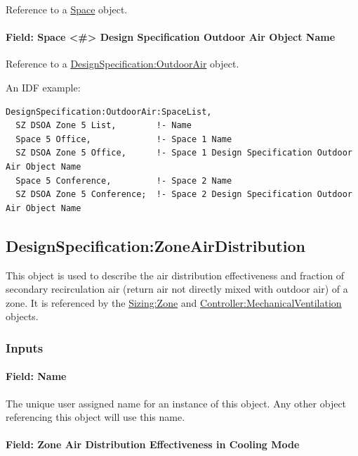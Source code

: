Reference to a \hyperref[space]{Space} object.

\paragraph{Field: Space \textless{}\#\textgreater{} Design Specification Outdoor Air Object Name}\label{field-dsoaspacelist-dsoa-name}

Reference to a \hyperref[designspecificationoutdoorair]{DesignSpecification:OutdoorAir} object.

An IDF example:

\begin{lstlisting}
DesignSpecification:OutdoorAir:SpaceList,
  SZ DSOA Zone 5 List,        !- Name
  Space 5 Office,             !- Space 1 Name
  SZ DSOA Zone 5 Office,      !- Space 1 Design Specification Outdoor Air Object Name
  Space 5 Conference,         !- Space 2 Name
  SZ DSOA Zone 5 Conference;  !- Space 2 Design Specification Outdoor Air Object Name
\end{lstlisting}

\subsection{DesignSpecification:ZoneAirDistribution}\label{designspecificationzoneairdistribution}

This object is used to describe the air distribution effectiveness and fraction of secondary recirculation air (return air not directly mixed with outdoor air) of a zone. It is referenced by the \hyperref[sizingzone]{Sizing:Zone} and \hyperref[controllermechanicalventilation]{Controller:MechanicalVentilation} objects.

\subsubsection{Inputs}\label{inputs-1-011}

\paragraph{Field: Name}\label{field-name-1-010}

The unique user assigned name for an instance of this object. Any other object referencing this object will use this name.

\paragraph{Field: Zone Air Distribution Effectiveness in Cooling Mode}\label{field-zone-air-distribution-effectiveness-in-cooling-mode}

